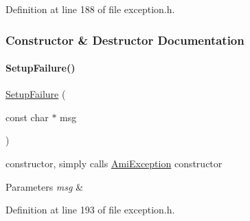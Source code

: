 Definition at line 188 of file exception.\+h.



\subsubsection{Constructor \& Destructor Documentation}
\mbox{\label{classamici_1_1_setup_failure_a86aa3460075a61cb0fe5f749bb1476f1}} 
\paragraph{\texorpdfstring{Setup\+Failure()}{SetupFailure()}}
{\footnotesize\ttfamily \mbox{\hyperlink{classamici_1_1_setup_failure}{Setup\+Failure}} (\begin{DoxyParamCaption}\item[{const char $\ast$}]{msg }\end{DoxyParamCaption})}

constructor, simply calls \mbox{\hyperlink{classamici_1_1_ami_exception}{Ami\+Exception}} constructor 
\begin{DoxyParams}{Parameters}
{\em msg} & \\
\hline
\end{DoxyParams}


Definition at line 193 of file exception.\+h.

